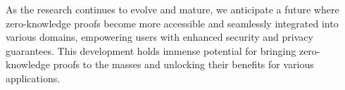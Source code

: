 As the research continues to evolve and mature, we anticipate a
future where zero-knowledge proofs become more accessible and
seamlessly integrated into various domains, empowering users with
enhanced security and privacy guarantees. This development holds
immense potential for bringing zero-knowledge proofs to the masses
and unlocking their benefits for various applications.





